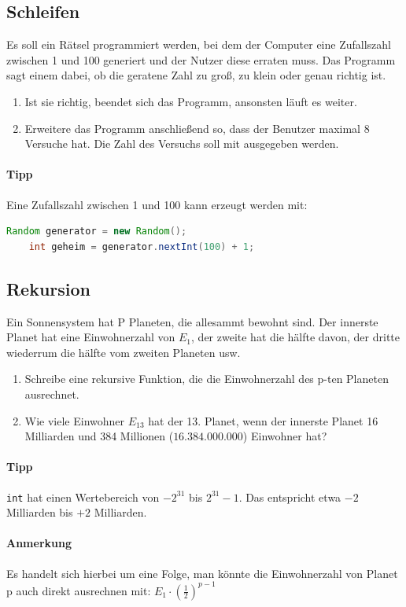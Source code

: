 \documentclass[11pt, a4paper]{article}
\begin{document}
\subsection{Schleifen}
Es soll ein Rätsel programmiert werden, bei dem der Computer eine Zufallszahl zwischen 1 und 100 generiert und der Nutzer diese erraten muss. Das Programm sagt einem dabei, ob die geratene Zahl zu groß, zu klein oder genau richtig ist.
\begin{enumerate}
	\item Ist sie richtig, beendet sich das Programm, ansonsten läuft es weiter.
	\item Erweitere das Programm anschließend so, dass der Benutzer maximal 8 Versuche hat. Die Zahl des Versuchs soll mit ausgegeben werden.
\end{enumerate}
\paragraph{Tipp} Eine Zufallszahl zwischen 1 und 100 kann erzeugt werden mit:
\begin{lstlisting}[language=Java]
	Random generator = new Random();
	int geheim = generator.nextInt(100) + 1;
\end{lstlisting}

\subsection{Rekursion}
Ein Sonnensystem hat P Planeten, die allesammt bewohnt sind. Der innerste Planet hat eine Einwohnerzahl von $E_1$, der zweite hat die hälfte davon, der dritte wiederrum die hälfte vom zweiten Planeten usw.
\begin{enumerate}
	\item Schreibe eine rekursive Funktion, die die Einwohnerzahl des p-ten Planeten ausrechnet.
	\item Wie viele Einwohner $E_{13}$ hat der 13. Planet, wenn der innerste Planet 16 Milliarden und 384 Millionen ($16.384.000.000$) Einwohner hat?
\end{enumerate}
\paragraph{Tipp} \texttt{int} hat einen Wertebereich von $-2^{31}$ bis $2^{31}-1$. Das entspricht etwa $-2$ Milliarden bis $+2$ Milliarden.
\paragraph{Anmerkung} Es handelt sich hierbei um eine Folge, man könnte die Einwohnerzahl von Planet p auch direkt ausrechnen mit: $E_1 \cdot \left(\frac{1}{2}\right)^{p-1}$
\end{document}
